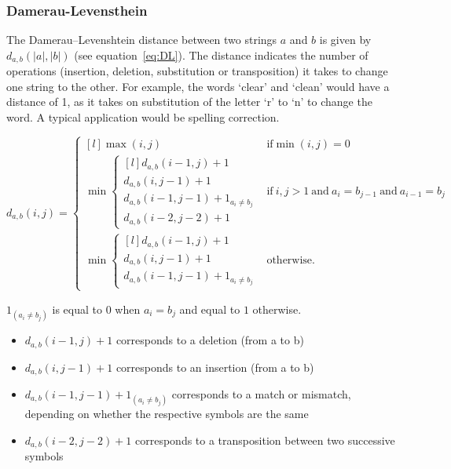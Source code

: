 \subsubsection{Damerau-Levensthein}

The Damerau–Levenshtein distance between two strings $a$ and $b$ is given by $d_{a,b}(|a|,|b|)$ (see equation~\ref{eq:DL}\marginnote{$\bm{\Sigma}$~\ref{eq:DL}})\autocite{WikipediaA, Damerau1964, Levenshtein1966}. The distance indicates the number of operations (insertion, deletion, substitution or transposition) it takes to change one string to the other. For example, the words `clear' and `clean' would have a distance of 1, as it takes on substitution of the letter `r' to `n' to change the word. A typical application would be spelling correction. 

\begin{equation}
  d_{a,b}(i,j)=\left\{\begin{matrix*}[l]
  \max(i,j) & \textrm{if}\min(i,j)=0\\
  \min\left\{\begin{matrix*}[l]
  d_{a,b}(i-1,j)+1\\
  d_{a,b}(i,j-1)+1\\
  d_{a,b}(i-1,j-1)+1_{a_i\neq b_j}\\
  d_{a,b}(i-2,j-2)+1
  \end{matrix*}\right. & \textrm{if}\ i,j > 1 \ \textrm{and}\ a_i = b_{j-1}\ \textrm{and}\ a_{i-1} = b_j\\
  \min\left\{\begin{matrix*}[l]
  d_{a,b}(i-1,j)+1\\
  d_{a,b}(i,j-1)+1\\
  d_{a,b}(i-1,j-1)+1_{a_i\neq b_j}
\end{matrix*}\right. & \textrm{otherwise.}
  \end{matrix*}\right.
  \label{eq:DL}
\end{equation}

$1_{(a_i \neq b_j)}$ is equal to $0$ when $a_i = b_j$ and equal to $1$ otherwise. 

\begin{itemize}
  \item $d_{a,b}(i-1,j) + 1$ corresponds to a deletion (from a to b)
  \item $d_{a,b}(i,j-1) + 1$ corresponds to an insertion (from a to b)
  \item $d_{a,b}(i-1,j-1) + 1_{(a_i \neq b_j)}$  corresponds to a match or mismatch, depending on whether the respective symbols are the same
  \item $d_{a,b}(i-2,j-2) + 1$  corresponds to a transposition between two successive symbols
\end{itemize}


